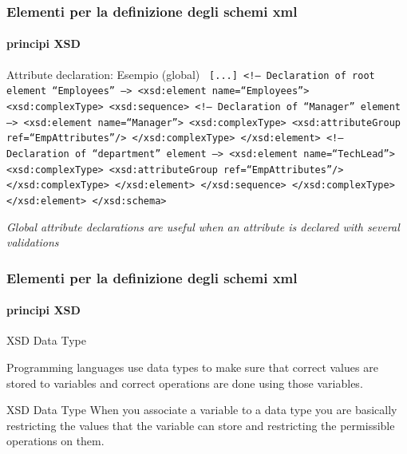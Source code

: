 \begin{frame}
	\frametitle{Elementi per la definizione degli schemi xml}
	\framesubtitle{principi XSD}
	\addtocounter{nframe}{1}

	\begin{block}{Attribute declaration: Esempio (global)}
		\texttt{
			[...]
			<!-- Declaration of root element ``Employees'' -->
			<xsd:element name=``Employees''>
			<xsd:complexType>
			<xsd:sequence>
			<!-- Declaration of ``Manager'' element -->
			<xsd:element name=``Manager''>
			<xsd:complexType>
			<xsd:attributeGroup ref=``EmpAttributes''/>
			</xsd:complexType>
			</xsd:element>
			<!-- Declaration of ``department'' element -->
			<xsd:element name=``TechLead''>
			<xsd:complexType>
			<xsd:attributeGroup ref=``EmpAttributes''/>
			</xsd:complexType>
			</xsd:element>
			</xsd:sequence>
			</xsd:complexType>
			</xsd:element>
			</xsd:schema>
		}
	\end{block}

	\textit{Global attribute declarations are useful when an attribute is declared with several validations}


\end{frame}





\begin{frame}
	\frametitle{Elementi per la definizione degli schemi xml}
	\framesubtitle{principi XSD}
	\addtocounter{nframe}{1}

	\begin{block}{XSD Data Type}

		Programming languages use data types to make sure that correct values are stored to variables and correct operations are done using those variables.
	\end{block}

	\begin{block}{XSD Data Type}
		When you associate a variable to a data type you are basically restricting the values that the variable can store and restricting the permissible operations on them.
	\end{block}

\end{frame}

